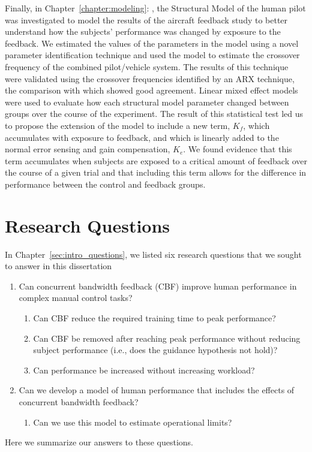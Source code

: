 Finally, in Chapter~\ref{chapter:modeling}: , the Structural Model of the human pilot was investigated to model the results of the aircraft feedback study to better understand how the subjects' performance was changed by exposure to the feedback.
We estimated the values of the parameters in the model using a novel parameter identification technique and used the model to estimate the crossover frequency of the combined pilot/vehicle system.
The results of this technique were validated using the crossover frequencies identified by an ARX technique, the comparison with which showed good agreement.
Linear mixed effect models were used to evaluate how each structural model parameter changed between groups over the course of the experiment.
The result of this statistical test led us to propose the extension of the model to include a new term, $K_f$, which accumulates with exposure to feedback, and which is linearly added to the normal error sensing and gain compensation, $K_e$.
We found evidence that this term accumulates when subjects are exposed to a critical amount of feedback over the course of a given trial and that including this term allows for the difference in performance between the control and feedback groups.

\section{Research Questions}

In Chapter~\ref{sec:intro_questions}, we listed six research questions that we sought to answer in this dissertation
\begin{enumerate}
    \item Can concurrent bandwidth feedback (CBF) improve human performance in complex manual control tasks?
          \begin{enumerate}
              \item Can CBF reduce the required training time to peak performance?
              \item Can CBF be removed after reaching peak performance without reducing subject performance (i.e., does the guidance hypothesis not hold)?
              \item Can performance be increased without increasing workload?
          \end{enumerate}
    \item Can we develop a model of human performance that includes the effects of concurrent bandwidth feedback?
          \begin{enumerate}
              \item Can we use this model to estimate operational limits?
          \end{enumerate}
\end{enumerate}
Here we summarize our answers to these questions.

